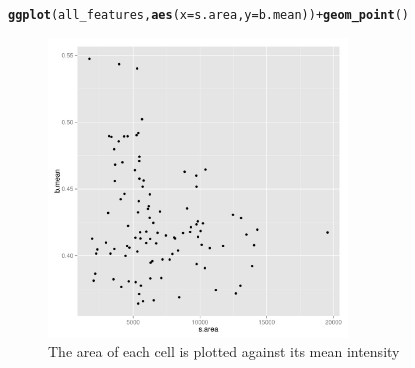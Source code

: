 \documentclass{article}\usepackage[]{graphicx}\usepackage[]{color}
\makeatletter
\newcommand{\hlopt}[1]{\textcolor[rgb]{0,0,0}{#1}}%
\newcommand{\hlstd}[1]{\textcolor[rgb]{0.345,0.345,0.345}{#1}}%
\newcommand{\hlkwc}[1]{\textcolor[rgb]{0.333,0.667,0.333}{#1}}%
\newcommand{\hlkwd}[1]{\textcolor[rgb]{0.737,0.353,0.396}{\textbf{#1}}}%
\newenvironment{kframe}{%
 \def\at@end@of@kframe{}%
 \ifinner\ifhmode%
  \def\at@end@of@kframe{\end{minipage}}%
  \begin{minipage}{\columnwidth}%
 \fi\fi%
 \def\FrameCommand##1{\hskip\@totalleftmargin \hskip-\fboxsep
 \colorbox{shadecolor}{##1}\hskip-\fboxsep
     \hskip-\linewidth \hskip-\@totalleftmargin \hskip\columnwidth}%
 \MakeFramed {\advance\hsize-\width
   \@totalleftmargin\z@ \linewidth\hsize
   \@setminipage}}%
 {\par\unskip\endMakeFramed%
 \at@end@of@kframe}
\newenvironment{knitrout}{}{} %
\makeatother
\begin{document}
\begin{knitrout}
\color{fgcolor}\begin{kframe}
\begin{alltt}
\hlkwd{ggplot}\hlstd{(all_features,} \hlkwd{aes}\hlstd{(}\hlkwc{x}\hlstd{=s.area,} \hlkwc{y}\hlstd{=b.mean))} \hlopt{+} \hlkwd{geom_point}\hlstd{()}
\end{alltt}
\end{kframe}\begin{figure}

{\centering \includegraphics[width=300px]{knit_figure/figscatter-1} 

}

\caption[The area of each cell is plotted against its mean intensity]{The area of each cell is plotted against its mean intensity\label{fig:scatter}}
\end{figure}


\end{knitrout}
\end{document}
